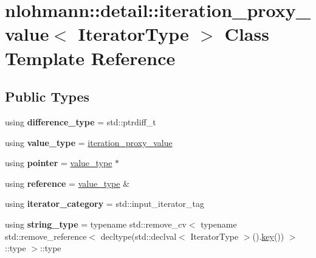 \hypertarget{classnlohmann_1_1detail_1_1iteration__proxy__value}{}\section{nlohmann\+:\+:detail\+:\+:iteration\+\_\+proxy\+\_\+value$<$ Iterator\+Type $>$ Class Template Reference}
\label{classnlohmann_1_1detail_1_1iteration__proxy__value}
\subsection*{Public Types}
\begin{DoxyCompactItemize}
\item 
\mbox{\label{classnlohmann_1_1detail_1_1iteration__proxy__value_ada6b4e6d55d8ed7ac79e49a03e9d1fe2}} 
using {\bfseries difference\+\_\+type} = std\+::ptrdiff\+\_\+t
\item 
\mbox{\label{classnlohmann_1_1detail_1_1iteration__proxy__value_a5e90a5810cc1bb6c1000eabbfdfe7b9e}} 
using {\bfseries value\+\_\+type} = \mbox{\hyperlink{classnlohmann_1_1detail_1_1iteration__proxy__value}{iteration\+\_\+proxy\+\_\+value}}
\item 
\mbox{\label{classnlohmann_1_1detail_1_1iteration__proxy__value_a44c64feee85b8e7164a05310e6418a4b}} 
using {\bfseries pointer} = \mbox{\hyperlink{classnlohmann_1_1detail_1_1iteration__proxy__value}{value\+\_\+type}} $\ast$
\item 
\mbox{\label{classnlohmann_1_1detail_1_1iteration__proxy__value_a5bc7d3133daab5ec4797f3132e093af8}} 
using {\bfseries reference} = \mbox{\hyperlink{classnlohmann_1_1detail_1_1iteration__proxy__value}{value\+\_\+type}} \&
\item 
\mbox{\label{classnlohmann_1_1detail_1_1iteration__proxy__value_a1ab8c44e3772c03651b5ad07216043cf}} 
using {\bfseries iterator\+\_\+category} = std\+::input\+\_\+iterator\+\_\+tag
\item 
\mbox{\label{classnlohmann_1_1detail_1_1iteration__proxy__value_a1fc63b88a585fa39942007aab69a74e6}} 
using {\bfseries string\+\_\+type} = typename std\+::remove\+\_\+cv$<$ typename std\+::remove\+\_\+reference$<$ decltype(std\+::declval$<$ Iterator\+Type $>$().\mbox{\hyperlink{classnlohmann_1_1detail_1_1iteration__proxy__value_af2949ac0d70212738030bfda29c5bcc2}{key}}()) $>$\+::type $>$\+::type
\end{DoxyCompactItemize}
